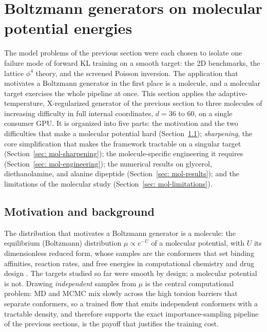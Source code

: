 \documentclass{article}
\begin{document}
\section{Boltzmann generators on molecular potential energies}
\label{sec: molecular}

The model problems of the previous section were each chosen to isolate one failure mode of forward KL training
on a smooth target: the 2D benchmarks, the lattice $\phi^4$ theory, and the screened Poisson inversion.
The application that motivates a Boltzmann generator in the first place is a molecule, and a molecular target
exercises the whole pipeline at once. This section applies the adaptive-temperature, X-regularized generator
of the previous section to three molecules of increasing difficulty in full internal coordinates,
$d = 36$ to $60$, on a single consumer GPU. It is organized into five parts: the motivation and the two
difficulties that make a molecular potential hard (Section~\ref{sec: mol-background}); \emph{sharpening}, the core simplification that makes the framework tractable on a singular target (Section~\ref{sec: mol-sharpening}); the
molecule-specific engineering it requires (Section~\ref{sec: mol-engineering}); the numerical results on
glycerol, diethanolamine, and alanine dipeptide (Section~\ref{sec: mol-results}); and the limitations of the
molecular study (Section~\ref{sec: mol-limitations}).

\subsection{Motivation and background}
\label{sec: mol-background}

The distribution that motivates a Boltzmann generator is a molecule: the equilibrium (Boltzmann) distribution
$\mu \propto e^{-U}$ of a molecular potential, with $U$ its dimensionless reduced form, whose samples are the conformers that set binding
affinities, reaction rates, and free energies in computational chemistry and drug design
\citep{noe2019boltzmann}. The targets studied so far were smooth by design; a molecular potential is not. Drawing \emph{independent} samples from
$\mu$ is the central computational problem: MD and MCMC mix slowly across
the high torsion barriers that separate conformers, so a trained flow that emits independent conformers with a
tractable density, and therefore supports the exact importance-sampling pipeline of the previous sections, is
the payoff that justifies the training cost.
\end{document}
